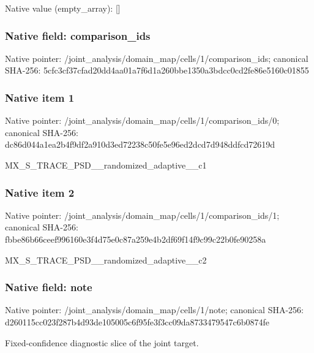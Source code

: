 \documentclass[10pt,a4paper]{article}
\begin{document}
Native value (empty\_\allowbreak{}array): []

\subsubsection{Native field: comparison\_\allowbreak{}ids}
Native pointer: /joint\_\allowbreak{}analysis/domain\_\allowbreak{}map/cells/1/comparison\_\allowbreak{}ids; canonical SHA-256: 5cfc3cf37cfad20dd4aa01a7f6d1a260bbe1350a3bdcc0cd2fe86e5160c01855

\subsubsection{Native item 1}
Native pointer: /joint\_\allowbreak{}analysis/domain\_\allowbreak{}map/cells/1/comparison\_\allowbreak{}ids/0; canonical SHA-256: dc86d044a1ea2b4f9df2a910d3ed72238c50fe5e96ed2dcd7d948ddfcd72619d

\begingroup\raggedright\sloppy MX\_\allowbreak{}S\_\allowbreak{}TRACE\_\allowbreak{}PSD\_\allowbreak{}\_\allowbreak{}randomized\_\allowbreak{}adaptive\_\allowbreak{}\_\allowbreak{}c1\par\endgroup

\subsubsection{Native item 2}
Native pointer: /joint\_\allowbreak{}analysis/domain\_\allowbreak{}map/cells/1/comparison\_\allowbreak{}ids/1; canonical SHA-256: fbbe86b66ceef996160e3f4d75e0c87a259e4b2df69f14f9c99c22b0fe90258a

\begingroup\raggedright\sloppy MX\_\allowbreak{}S\_\allowbreak{}TRACE\_\allowbreak{}PSD\_\allowbreak{}\_\allowbreak{}randomized\_\allowbreak{}adaptive\_\allowbreak{}\_\allowbreak{}c2\par\endgroup

\subsubsection{Native field: note}
Native pointer: /joint\_\allowbreak{}analysis/domain\_\allowbreak{}map/cells/1/note; canonical SHA-256: d260115cc023f287b4d93de105005c6f95fe3f3cc09da8733479547c6b0874fe

\begingroup\raggedright\sloppy Fixed-confidence diagnostic slice of the joint target.\par\endgroup
\end{document}
